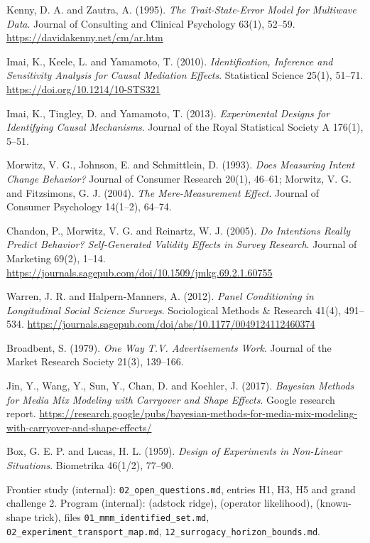 \begin{enumerate}[label={[\arabic*]},leftmargin=2.5em]
\item Kenny, D. A. and Zautra, A. (1995). \emph{The Trait-State-Error Model for Multiwave Data}. Journal of Consulting and Clinical Psychology 63(1), 52--59. \url{https://davidakenny.net/cm/ar.htm}
\item Imai, K., Keele, L. and Yamamoto, T. (2010). \emph{Identification, Inference and Sensitivity Analysis for Causal Mediation Effects}. Statistical Science 25(1), 51--71. \url{https://doi.org/10.1214/10-STS321}
\item Imai, K., Tingley, D. and Yamamoto, T. (2013). \emph{Experimental Designs for Identifying Causal Mechanisms}. Journal of the Royal Statistical Society A 176(1), 5--51.
\item Morwitz, V. G., Johnson, E. and Schmittlein, D. (1993). \emph{Does Measuring Intent Change Behavior?} Journal of Consumer Research 20(1), 46--61; Morwitz, V. G. and Fitzsimons, G. J. (2004). \emph{The Mere-Measurement Effect}. Journal of Consumer Psychology 14(1--2), 64--74.
\item Chandon, P., Morwitz, V. G. and Reinartz, W. J. (2005). \emph{Do Intentions Really Predict Behavior? Self-Generated Validity Effects in Survey Research}. Journal of Marketing 69(2), 1--14. \url{https://journals.sagepub.com/doi/10.1509/jmkg.69.2.1.60755}
\item Warren, J. R. and Halpern-Manners, A. (2012). \emph{Panel Conditioning in Longitudinal Social Science Surveys}. Sociological Methods \& Research 41(4), 491--534. \url{https://journals.sagepub.com/doi/abs/10.1177/0049124112460374}
\item Broadbent, S. (1979). \emph{One Way T.V. Advertisements Work}. Journal of the Market Research Society 21(3), 139--166.
\item Jin, Y., Wang, Y., Sun, Y., Chan, D. and Koehler, J. (2017). \emph{Bayesian Methods for Media Mix Modeling with Carryover and Shape Effects}. Google research report. \url{https://research.google/pubs/bayesian-methods-for-media-mix-modeling-with-carryover-and-shape-effects/}
\item Box, G. E. P. and Lucas, H. L. (1959). \emph{Design of Experiments in Non-Linear Situations}. Biometrika 46(1/2), 77--90.
\item Frontier study (internal): \texttt{02\_open\_questions.md}, entries H1, H3, H5 and grand challenge 2. Program (internal):  (adstock ridge),  (operator likelihood),  (known-shape trick), files \texttt{01\_mmm\_identified\_set.md}, \texttt{02\_experiment\_transport\_map.md}, \texttt{12\_surrogacy\_horizon\_bounds.md}.
\end{enumerate}
\endgroup
